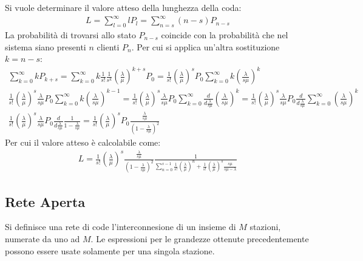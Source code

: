 \documentclass{article}
\numberwithin{equation}{subsection}
\begin{document}
Si vuole determinare il valore atteso della lunghezza della coda:
\begin{gather*}
    L=\displaystyle\sum_{l=0}^{\infty}lP_l=\sum_{n=s}^{\infty}(n-s)P_{n-s}
\end{gather*}
La probabilità di trovarsi allo stato $P_{n-s}$ coincide con la probabilità che nel sistema siano presenti $n$ clienti $P_n$. Per cui si applica un'altra sostituzione $k=n-s$:
\begin{gather*}
    \displaystyle\sum_{k=0}^{\infty}kP_{k+s}=\sum_{k=0}^{\infty}k\frac{1}{s!}\frac{1}{s^k}\left(\frac{\lambda}{\mu}\right)^{k+s}P_0=\frac{1}{s!}\left(\frac{\lambda}{\mu}\right)^{s}P_0\sum_{k=0}^{\infty}k\left(\frac{\lambda}{s\mu}\right)^{k}\\
    \displaystyle\frac{1}{s!}\left(\frac{\lambda}{\mu}\right)^{s}\frac{\lambda}{s\mu}P_0\sum_{k=0}^{\infty}k\left(\frac{\lambda}{s\mu}\right)^{k-1}=\frac{1}{s!}\left(\frac{\lambda}{\mu}\right)^{s}\frac{\lambda}{s\mu}P_0\sum_{k=0}^{\infty}\frac{d}{d\frac{\lambda}{s\mu}}\left(\frac{\lambda}{s\mu}\right)^{k}
    =\frac{1}{s!}\left(\frac{\lambda}{\mu}\right)^{s}\frac{\lambda}{s\mu}P_0\frac{d}{d\frac{\lambda}{s\mu}}\sum_{k=0}^{\infty}\left(\frac{\lambda}{s\mu}\right)^{k}\\
    \frac{1}{s!}\left(\frac{\lambda}{\mu}\right)^{s}\frac{\lambda}{s\mu}P_0\frac{d}{d\frac{\lambda}{s\mu}}\frac{1}{1-\displaystyle\frac{\lambda}{s\mu}}=\frac{1}{s!}\left(\frac{\lambda}{\mu}\right)^{s}P_0\frac{\displaystyle\frac{\lambda}{s\mu}}{\left(1-\displaystyle\frac{\lambda}{s\mu}\right)^2}
\end{gather*}
Per cui il valore atteso è calcolabile come:
\begin{gather}
    L=\frac{1}{s!}\left(\frac{\lambda}{\mu}\right)^{s}\frac{\displaystyle\frac{\lambda}{s\mu}}{\left(1-\displaystyle\frac{\lambda}{s\mu}\right)^2}\frac{1}{\displaystyle\sum_{n=0}^{s-1}\frac{1}{s!}\left(\frac{\lambda}{\mu}\right)^n+\frac{1}{s!}\left(\frac{\lambda}{\mu}\right)^s\frac{s\mu}{s\mu-\lambda}}
\end{gather}

\subsection{Rete Aperta}

Si definisce una rete di code l'interconnesione di un insieme di $M$ stazioni, numerate da uno ad $M$. Le espressioni per le grandezze ottenute precedentemente possono essere 
usate solamente per una singola stazione. 
\end{document}
